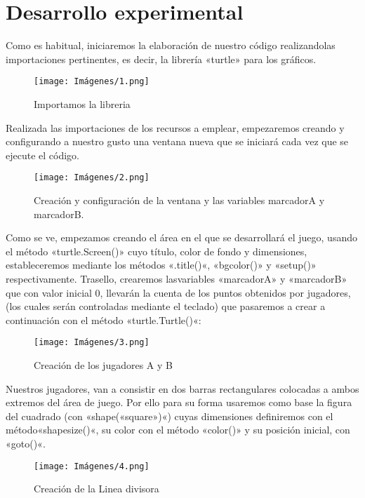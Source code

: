 \documentclass[journal]{IEEEtran}
\begin{document}

\section{Desarrollo experimental}	
Como es habitual, iniciaremos la elaboración de nuestro código realizandolas importaciones pertinentes, es decir, la librería «turtle» para los gráficos.

\begin{figure}[ht]
    \centering
    \texttt{[image: Imágenes/1.png]}
    \caption{Importamos la libreria}
    \label{fig:my_label}
\end{figure}

Realizada las importaciones de los recursos a emplear, empezaremos creando y configurando a nuestro gusto una ventana nueva que se iniciará cada vez que se ejecute el código.

\begin{figure}[ht]
    \centering
    \texttt{[image: Imágenes/2.png]}
    \caption{Creación y configuración de la ventana y las variables marcadorA y marcadorB. }
    \label{fig:my_label}
\end{figure}

Como se ve, empezamos creando el área en el que se desarrollará el juego, usando el método «turtle.Screen()» cuyo título, color de fondo y dimensiones, estableceremos mediante los métodos «.title()«, «bgcolor()» y «setup()» respectivamente. Trasello, crearemos lasvariables «marcadorA» y «marcadorB» que con valor inicial 0, llevarán la cuenta de los puntos obtenidos por jugadores, (los cuales serán controladas mediante el teclado) que pasaremos a crear a continuación con el método «turtle.Turtle()«:

\begin{figure}[ht]
    \centering
    \texttt{[image: Imágenes/3.png]}
    \caption{Creación de los jugadores A y B}
    \label{fig:my_label}
\end{figure}

Nuestros jugadores, van a consistir en dos barras rectangulares colocadas a ambos extremos del área de juego. Por ello para su forma usaremos como base la figura del cuadrado (con «shape(«square»)«) cuyas dimensiones definiremos con el método«shapesize()«, su color con el método «color()» y su posición inicial, con «goto()«.\\

\begin{figure}[ht]
    \centering
    \texttt{[image: Imágenes/4.png]}
    \caption{Creación de la Linea divisora}
    \label{fig:my_label}
\end{figure}
\end{document}
